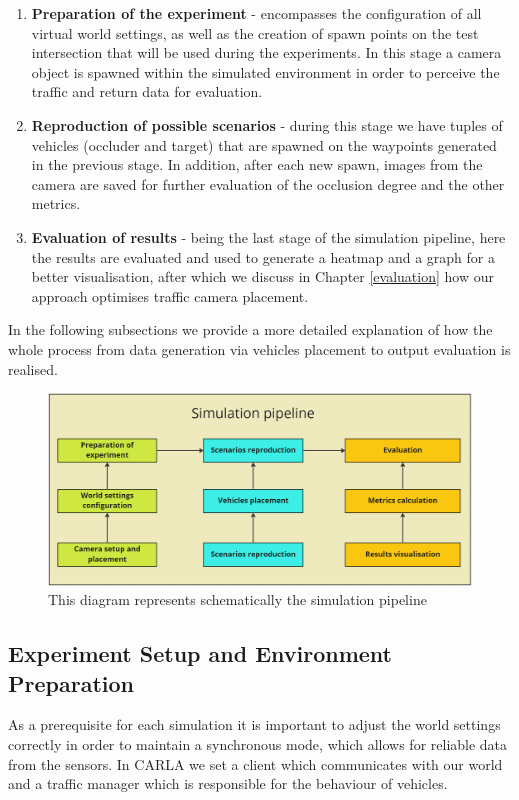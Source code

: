 \begin{enumerate}
    \item \textbf{Preparation of the experiment} - encompasses the configuration of all virtual world settings, as well as the creation of spawn points on the test intersection that will be used during the experiments. In this stage a camera object is spawned within the simulated environment in order to perceive the traffic and return data for evaluation. 
    \item \textbf{Reproduction of possible scenarios} - during this stage we have tuples of vehicles (occluder and target) that are spawned on the waypoints generated in the previous stage. In addition, after each new spawn, images from the camera are saved for further evaluation of the occlusion degree and the other metrics.
    \item \textbf{Evaluation of results} - being the last stage of the simulation pipeline, here the results are evaluated and used to generate a heatmap and a graph for a better visualisation, after which we discuss in Chapter \ref{evaluation} how our approach optimises traffic camera placement.
\end{enumerate}
In the following subsections we provide a more detailed explanation of how the whole process from data generation via vehicles placement to output evaluation is realised.
\begin{figure} [h]
    \centering
    \includegraphics[width=\textwidth]{images/evaluation_pipeline.png}
    \caption[Evaluation pipeline]{This diagram represents schematically the simulation pipeline}
    \label{fig:evaluation_pipeline}
\end{figure}

\subsection{Experiment Setup and Environment Preparation}
As a prerequisite for each simulation it is important to adjust the world settings correctly in order to maintain a synchronous mode, which allows for reliable data from the sensors. In CARLA we set a client which communicates with our world and a traffic manager which is responsible for the behaviour of vehicles. 

